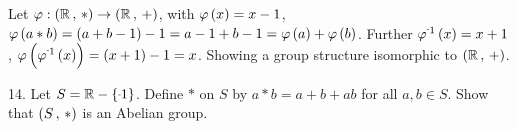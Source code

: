\begin{mdframed}[style=darkAnswer,frametitle={Joe Starr}]
\begin{itemize}[align=left]
{          }
  \end{itemize}
\end{mdframed}
\begin{mdframed}[style=darkAnswer,frametitle={Joe Starr}]
  Let $\varphi:\left(\mathbb{R}\,,\,\ast\right)\to\left(\mathbb{R}\,,\,+\right)$, with $\varphi\left(x\right)=x-1$,
  $\varphi\left(a\ast b\right)= \left(a+b-1\right)-1=a-1+b-1=\varphi\left(a\right)+\varphi\left(b\right)$. Further
  $\inv{\varphi}\lrp{x}=x+1$, $\pof{\inv{\varphi}\lrp{x}}=\lrp{x+1}-1=x$.
  Showing a group structure isomorphic to $\left(\mathbb{R}\,,\,+\right)$.
\end{mdframed}
\newpage
\begin{mdframed}[style=darkQuesion]
  14. Let $S= \R - \lrs{\m1}$. Define $\ast$ on $S$ by $a\ast b=a+b+ab$ for all
  $a,b \in S$. Show that $\left(S\,,\,\ast\right)$ is an Abelian group.
\end{mdframed}

